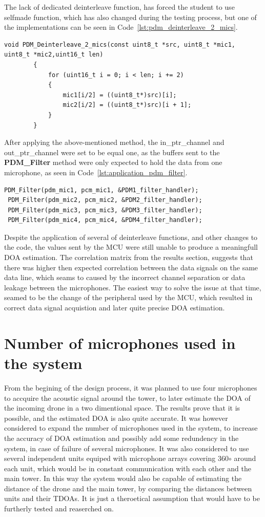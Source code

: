 The lack of dedicated deinterleave function, has forced the student to use selfmade function, which has also changed during the testing process, but one of the implementations can be seen in Code~\ref{lst:pdm_deinterleave_2_mics}.

\begin{lstlisting}[style=cstyle, caption={Method used to deinterleave two mics from one buffer at a time}, label={lst:pdm_deinterleave_2_mics}]
void PDM_Deinterleave_2_mics(const uint8_t *src, uint8_t *mic1, uint8_t *mic2,uint16_t len)
		{
			for (uint16_t i = 0; i < len; i += 2)
			{
				mic1[i/2] = ((uint8_t*)src)[i];
				mic2[i/2] = ((uint8_t*)src)[i + 1];
			}
		}
\end{lstlisting}
\newpage
After applying the above-mentioned method, the in\_ptr\_channel and out\_ptr\_channel were set to be equal one, as the buffers sent to the \textbf{PDM\_Filter} method were only expected to hold the data from one microphone, as seen in Code~\ref{lst:application_pdm_filter}.

\begin{lstlisting}[style=cstyle, caption={Application of the PDM\_Filter method}, label={lst:application_pdm_filter}]
 PDM_Filter(pdm_mic1, pcm_mic1, &PDM1_filter_handler);
 PDM_Filter(pdm_mic2, pcm_mic2, &PDM2_filter_handler);
 PDM_Filter(pdm_mic3, pcm_mic3, &PDM3_filter_handler);
 PDM_Filter(pdm_mic4, pcm_mic4, &PDM4_filter_handler);
\end{lstlisting}

Despite the application of several of deinterleave functions, and other changes to the code, the values sent by the MCU were still unable to produce a meaningfull DOA estimation. The correlation matrix from the results section, suggests that there was higher then expected correlation between the data signals on the same data line, which seams to caused by the incorrect channel separation or data leakage between the microphones. The easiest way to solve the issue at that time, seamed to be the change of the peripheral used by the MCU, which resulted in correct data signal acquistion and later quite precise DOA estimation.   
%
\section{Number of microphones used in the system}
From the begining of the design process, it was planned to use four microphones to accquire the acoustic signal around the tower, to later estimate the DOA of the incoming drone in a two dimentional space. The results prove that it is possible, and the estimated DOA is also quite accurate. It was however considered to expand the number of microphones used in the system, to increase the accuracy of DOA estimation and possibly add some redundency in the system, in case of failure of several microphones. It was also considered to use several independent units equiped with microphone arrays covering 360$\circ$ around each unit, which would be in constant communication with each other and the main tower. In this way the system would also be capable of estimating the distance of the drone and the main tower, by comparing the distances between units and their TDOAs. It is just a theroetical assumption that would have to be furtherly tested and reaserched on.      

